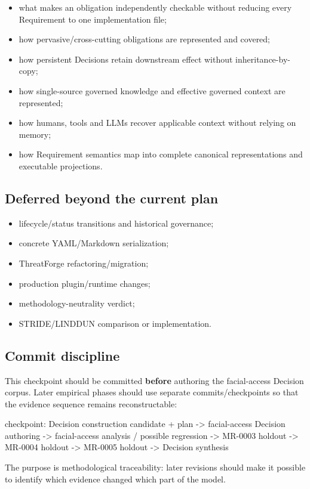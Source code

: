 \documentclass[
  10pt,
]{article}
\newenvironment{Shaded}{}{}
\newcommand{\NormalTok}[1]{#1}
\providecommand{\tightlist}{%
  \setlength{\itemsep}{0pt}\setlength{\parskip}{0pt}}
\begin{document}
\begin{itemize}
\tightlist
\item
  what makes an obligation independently checkable without reducing
  every Requirement to one implementation file;
\item
  how pervasive/cross-cutting obligations are represented and covered;
\item
  how persistent Decisions retain downstream effect without
  inheritance-by-copy;
\item
  how single-source governed knowledge and effective governed context
  are represented;
\item
  how humans, tools and LLMs recover applicable context without relying
  on memory;
\item
  how Requirement semantics map into complete canonical representations
  and executable projections.
\end{itemize}

\subsection{Deferred beyond the current
plan}\label{deferred-beyond-the-current-plan}

\begin{itemize}
\tightlist
\item
  lifecycle/status transitions and historical governance;
\item
  concrete YAML/Markdown serialization;
\item
  ThreatForge refactoring/migration;
\item
  production plugin/runtime changes;
\item
  methodology-neutrality verdict;
\item
  STRIDE/LINDDUN comparison or implementation.
\end{itemize}

\subsection{Commit discipline}\label{commit-discipline}

This checkpoint should be committed \textbf{before} authoring the
facial-access Decision corpus. Later empirical phases should use
separate commits/checkpoints so that the evidence sequence remains
reconstructable:

\begin{Shaded}
\begin{Highlighting}[]
\NormalTok{checkpoint: Decision construction candidate + plan}
\NormalTok{    {-}\textgreater{} facial{-}access Decision authoring}
\NormalTok{    {-}\textgreater{} facial{-}access analysis / possible regression}
\NormalTok{    {-}\textgreater{} MR{-}0003 holdout}
\NormalTok{    {-}\textgreater{} MR{-}0004 holdout}
\NormalTok{    {-}\textgreater{} MR{-}0005 holdout}
\NormalTok{    {-}\textgreater{} Decision synthesis}
\end{Highlighting}
\end{Shaded}

The purpose is methodological traceability: later revisions should make
it possible to identify which evidence changed which part of the model.
\end{document}
